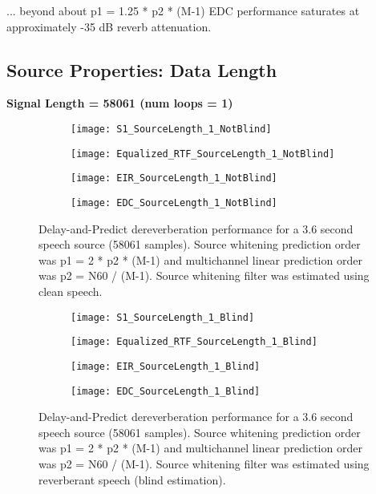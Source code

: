 ... beyond about p1 = 1.25 * p2 * (M-1) EDC performance saturates at approximately -35 dB reverb attenuation.

\subsection{Source Properties: Data Length}

\textbf{Signal Length = 58061 (num loops = 1)}

\begin{figure}[H]
	\centering
	\begin{subfigure}[b]{0.49\textwidth}
		\centering
		\texttt{[image: S1\_SourceLength\_1\_NotBlind]}
	\end{subfigure}
	\hfill
	\begin{subfigure}[b]{0.49\textwidth}
		\centering
		\texttt{[image: Equalized\_RTF\_SourceLength\_1\_NotBlind]}
	\end{subfigure}
	\hfill
	\begin{subfigure}[b]{0.49\textwidth}
		\centering
		\texttt{[image: EIR\_SourceLength\_1\_NotBlind]}
	\end{subfigure}
	\hfill
	\begin{subfigure}[b]{0.49\textwidth}
		\centering
		\texttt{[image: EDC\_SourceLength\_1\_NotBlind]}
	\end{subfigure}
	\hfill
	\caption{Delay-and-Predict dereverberation performance for a 3.6 second speech source (58061 samples). Source whitening prediction order was p1 = 2 * p2 * (M-1) and multichannel linear prediction order was p2 = N60 / (M-1). Source whitening filter was estimated using clean speech.}
	\label{fig:params_source_length_1_not_blind}
\end{figure}

\begin{figure}[H]
	\centering
	\begin{subfigure}[b]{0.49\textwidth}
		\centering
		\texttt{[image: S1\_SourceLength\_1\_Blind]}
	\end{subfigure}
	\hfill
	\begin{subfigure}[b]{0.49\textwidth}
		\centering
		\texttt{[image: Equalized\_RTF\_SourceLength\_1\_Blind]}
	\end{subfigure}
	\hfill
	\begin{subfigure}[b]{0.49\textwidth}
		\centering
		\texttt{[image: EIR\_SourceLength\_1\_Blind]}
	\end{subfigure}
	\hfill
	\begin{subfigure}[b]{0.49\textwidth}
		\centering
		\texttt{[image: EDC\_SourceLength\_1\_Blind]}
	\end{subfigure}
	\hfill
	\caption{Delay-and-Predict dereverberation performance for a 3.6 second speech source (58061 samples). Source whitening prediction order was p1 = 2 * p2 * (M-1) and multichannel linear prediction order was p2 = N60 / (M-1). Source whitening filter was estimated using reverberant speech (blind estimation).}
	\label{fig:params_source_length_1_blind}
\end{figure}



